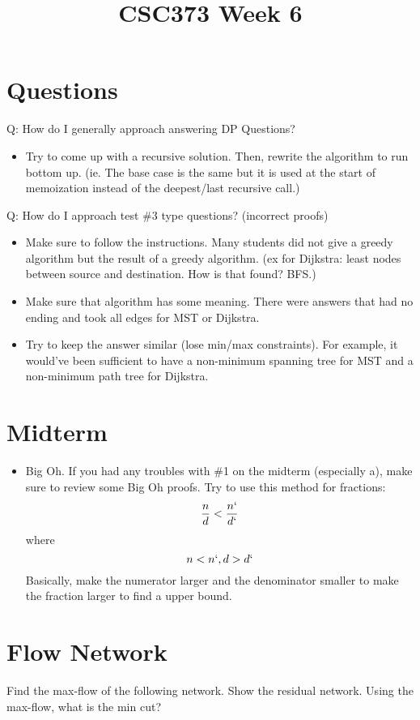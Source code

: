 \documentclass[]{article}
\title{CSC373 Week 6}
\author{}
\begin{document}
\section{Questions}
Q: How do I generally approach answering DP Questions?\\
\begin{itemize}
	\item Try to come up with a recursive solution. Then, rewrite the algorithm to run bottom up. (ie. The base case is the same but it is used at the start of memoization instead of the deepest/last recursive call.)
\end{itemize}
Q: How do I approach test \#3 type questions? (incorrect proofs)
\begin{itemize}
	\item Make sure to follow the instructions. Many students did not give a greedy algorithm but the result of a greedy algorithm. (ex for Dijkstra: least nodes between source and destination. How is that found? BFS.)
	\item Make sure that algorithm has some meaning. There were answers that had no ending and took all edges for MST or Dijkstra.
	\item Try to keep the answer similar (lose min/max constraints). For example, it would've been sufficient to have a non-minimum spanning tree for MST and a non-minimum path tree for Dijkstra.
\end{itemize}


\section{Midterm}
\begin{itemize}
	\item Big Oh. If you had any troubles with \#1 on the midterm (especially a), make sure to review some Big Oh proofs.
	Try to use this method for fractions:
	\[\frac{n}{d} < \frac{n`}{d`}\]
	where
	\[n < n`, d > d`\]
	Basically, make the numerator larger and the denominator smaller to make the fraction larger to find a upper bound.
\end{itemize}

\section{Flow Network}
Find the max-flow of the following network. Show the residual network. Using the max-flow, what is the min cut?

\end{document}

